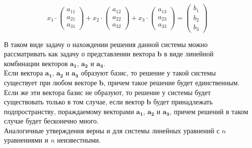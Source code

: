 \documentclass{article}
\begin{document}
\[
	x_1 \cdot \begin{pmatrix} a_{11} \\ a_{21} \\ a_{31} \end{pmatrix} + 
	x_2 \cdot \begin{pmatrix} a_{12} \\ a_{22} \\ a_{32} \end{pmatrix} + 
	x_3 \cdot \begin{pmatrix} a_{13} \\ a_{23} \\ a_{33} \end{pmatrix} =
	\begin{pmatrix} b_1 \\ b_2 \\ b_3 \end{pmatrix} 
\]

В таком виде задачу о нахождении решения данной системы можно рассматривать как задачу о представлении вектора $\mathbf{b}$ в виде линейной комбинации векторов $\mathbf{a_1}$, $\mathbf{a_2}$ и $\mathbf{a_3}$. \\

Если вектора $\mathbf{a_1}$, $\mathbf{a_2}$ и $\mathbf{a_3}$ образуют базис, то решение у такой системы существует при любом векторе $\mathbf{b}$, причем такое решение будет единственным. Если же эти вектора базис не образуют, то решение у системы будет существовать только в том случае, если вектор $\mathbf{b}$ будет принадлежать подпространству, пораждаемому векторами $\mathbf{a_1}$, $\mathbf{a_2}$ и $\mathbf{a_3}$, причем решений в таком случае будет бесконечно много. \\

Аналогичные утверждения верны и для системы линейных уравнений с $n$ уравнениями и $n$ неизвестными.
\end{document}

